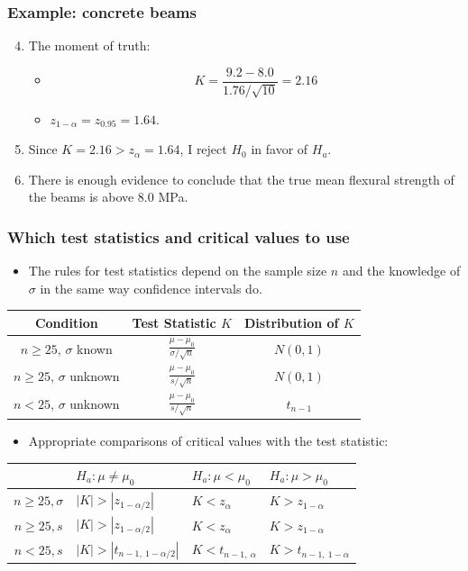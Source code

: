 \documentclass[handout]{beamer}\usepackage{graphicx, color}
\numberwithin{equation}{section}
\begin{document}
\begin{frame}
\frametitle{Example: concrete beams}
\begin{enumerate}
\setcounter{enumi}{3}
\item The moment of truth:
\begin{itemize}
\pause \item \[K = \frac{9.2 -  8.0}{1.76/\sqrt{10}} = 2.16\]
\pause \item $z_{1-\alpha} = z_{0.95} = 1.64$.
\end{itemize}
\pause \item Since $K = 2.16 > z_\alpha = 1.64$, I reject $H_0$ in favor of $H_a$.
\pause \item There is enough evidence to conclude that the true mean flexural strength of the beams is above 8.0 MPa.
\end{enumerate}
\end{frame}


\begin{frame}
\frametitle{Which test statistics and critical values to use} \scriptsize
\begin{itemize}
\item The rules for test statistics depend on the sample size $n$ and the knowledge of $\sigma$ in the same way confidence intervals do.
\end{itemize}
\pause \begin{tabular}{c|cc}
Condition & Test Statistic $K$& Distribution of $K$ \\ \hline
$n \ge 25$, $\sigma$ known  & $\displaystyle \frac{\mu - \mu_0}{\sigma/\sqrt{n}} $& $N(0,1)$  \\ [2.5ex]
$n \ge 25$, $\sigma$ unknown  &  $\displaystyle \frac{\mu-\mu_0}{s/\sqrt{n}}$ & $N(0,1)$ \\ [2.5ex]
$n < 25$, $\sigma$ unknown  & $\displaystyle \frac{\mu-\mu_0}{s/\sqrt{n}}$ & $t_{n-1}$   \\ [2.5ex]
\end{tabular}
\begin{itemize}
\pause \item Appropriate comparisons of critical values with the test statistic:
\end{itemize}
\pause \begin{tabular}{c|lll}
 & $H_a: \mu \ne \mu_0$ & $H_a: \mu < \mu_0$ & $H_a: \mu > \mu_0$  \\ \hline
$n \ge 25, \sigma$ & $|K| > |z_{1- \alpha/2}| $& $K < z_{\alpha}$ & $K > z_{1-\alpha}$ \\ [2.5ex]
$n \ge 25, s$ & $|K| > |z_{1 - \alpha/2}| $ & $K < z_{\alpha}$ &  $K > z_{1-\alpha}$\\ [2.5ex]
$n < 25, s$    & $|K| > |t_{n - 1,\  1 - \alpha/2}|$ & $K < t_{n - 1,\ \alpha}$ &$K > t_{n - 1, \ 1- \alpha}$   \\ [2.5ex]
\end{tabular}
\end{frame}
\end{document}
